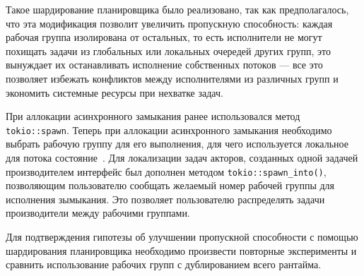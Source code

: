 Такое шардирование планировщика было реализовано, так как предполагалось, что эта модификация позволит увеличить пропускную способность: каждая рабочая группа изолирована от остальных, то есть исполнители не могут похищать задачи из глобальных или локальных очередей других групп, это вынуждает их останавливать исполнение собственных потоков --- все это позволяет избежать конфликтов между исполнителями из различных групп и экономить системные ресурсы при нехватке задач.

При аллокации асинхронного замыкания ранее использовался метод \verb|tokio::spawn|. Теперь при аллокации асинхронного замыкания необходимо выбрать рабочую группу для его выполнения, для чего используется локальное для потока состояние~\cite{xorshiftRNG}. Для локализации задач акторов, созданных одной задачей производителем интерфейс был дополнен методом \verb|tokio::spawn_into()|, позволяющим пользователю сообщать желаемый номер рабочей группы для исполнения зымыкания. Это позволяет пользователю распределять задачи производители между рабочими группами.

Для подтверждения гипотезы об улучшении пропускной способности с помощью шардирования планировщика необходимо произвести повторные эксперименты и сравнить использование рабочих групп с дублированием всего рантайма.
